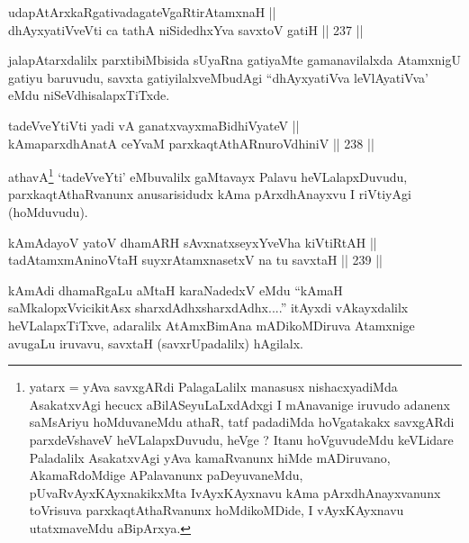 
\begin{shl}
udapAtArxkaRgativadagateVgaRtirAtamxnaH || \\
dhAyxyatiVveVti ca tathA niSidedhxYva savxtoV gatiH \hfill || 237 ||  
\end{shl}

\begin{artha}
jalapAtarxdalilx parxtibiMbisida sUyaRna gatiyaMte gamanavilalxda
AtamxnigU gatiyu baruvudu, savxta gatiyilalxveMbudAgi ``dhAyxyatiVva
leVlAyatiVva' eMdu niSeVdhisalapxTiTxde.
\end{artha}



\begin{shl}
tadeVveYtiVti yadi vA ganatxvayxmaBidhiVyateV || \\
kAmaparxdhAnatA ceYvaM parxkaqtAthARnuroVdhiniV \hfill || 238 ||  
\end{shl}

\begin{artha}
athavA\footnote{yatarx = yAva savxgARdi PalagaLalilx manasusx
nishacxyadiMda AsakatxvAgi hecucx aBilASeyuLaLxdAdxgi I mAnavanige
iruvudo adanenx saMsAriyu hoMduvaneMdu athaR, tatf padadiMda
hoVgatakakx savxgARdi parxdeVshaveV heVLalapxDuvudu, heVge ? Itanu
hoVguvudeMdu keVLidare Paladalilx AsakatxvAgi yAva kamaRvanunx hiMde
mADiruvano, AkamaRdoMdige APalavanunx paDeyuvaneMdu,
pUvaRvAyxKAyxnakikxMta IvAyxKAyxnavu kAma pArxdhAnayxvanunx
toVrisuva parxkaqtAthaRvanunx hoMdikoMDide, I vAyxKAyxnavu
utatxmaveMdu aBipArxya.} `tadeVveYti' eMbuvalilx gaMtavayx Palavu
heVLalapxDuvudu, parxkaqtAthaRvanunx anusarisidudx kAma pArxdhAnayxvu
I riVtiyAgi (hoMduvudu).
\end{artha}

\begin{shl}
kAmAdayoV yatoV dhamARH sAvxnatxseyxYveVha kiVtiRtAH || \\
tadAtamxmAninoV\s taH suyxrAtamxnasetxV na tu savxtaH \hfill || 239 ||  
\end{shl}

\begin{artha}
kAmAdi dhamaRgaLu aMtaH karaNadedxV eMdu ``kAmaH saMkalopxVvicikitAsx
sharxdAdhx\s sharxdAdhx....'' itAyxdi vAkayxdalilx heVLalapxTiTxve,
adaralilx AtAmxBimAna mADikoMDiruva Atamxnige avugaLu iruvavu, savxtaH
(savxrUpadalilx) hAgilalx.
\end{artha}

